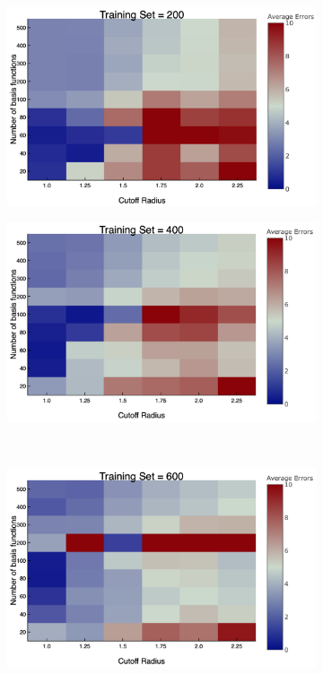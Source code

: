 \begin{figure}
  \centering
  \begin{subfigure}{0.5\textwidth}
    \includegraphics[width=\linewidth]{Figures/aveErrors2}
    \caption{} 
    \label{aveErrors2}
  \end{subfigure}%
  \hspace*{\fill}   %
  \begin{subfigure}{0.5\textwidth}
    \includegraphics[width=\linewidth]{Figures/aveErrors4}
    \caption{} 
    \label{aveErrors4}
  \end{subfigure}%
    \\
  \begin{subfigure}{0.5\textwidth}
    \includegraphics[width=\linewidth]{Figures/aveErrors6}

\end{subfigure}
\end{figure}

